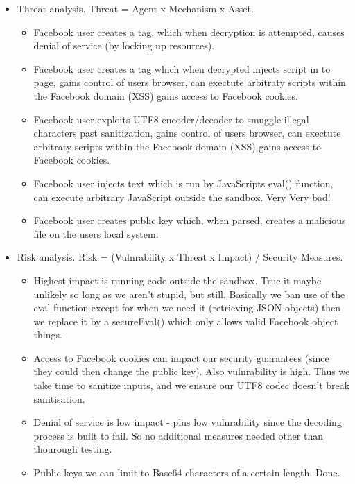         \begin{itemize}
            \item Threat analysis. Threat = Agent x Mechanism x Asset.
            \begin{itemize}
                \item Facebook user creates a tag, which when decryption is attempted, causes denial of service (by locking up resources).
                \item Facebook user creates a tag which when decrypted injects script in to page, gains control of users browser, can exectute arbitraty scripts within the Facebook domain (XSS) gains access to Facebook cookies.
                \item Facebook user exploits UTF8 encoder/decoder to smuggle illegal characters past sanitization, gains control of users browser, can exectute arbitraty scripts within the Facebook domain (XSS) gains access to Facebook cookies.
                \item Facebook user injects text which is run by JavaScripts eval() function, can execute arbitrary JavaScript outside the sandbox. Very Very bad!
                \item Facebook user creates public key which, when parsed, creates a malicious file on the users local system.
            \end{itemize}
            \item Risk analysis. Risk = (Vulnrability x Threat x Impact) / Security Measures.
            \begin{itemize}
                \item Highest impact is running code outside the sandbox. True it maybe unlikely so long as we aren't stupid, but still. Basically we ban use of the eval function except for when we need it (retrieving JSON objects) then we replace it by a secureEval() which only allows valid Facebook object things.
                \item Access to Facebook cookies can impact our security guarantees (since they could then change the public key). Also vulnrability is high. Thus we take time to sanitize inputs, and we ensure our UTF8 codec doesn't break sanitisation.
                \item Denial of service is low impact - plus low vulnrability since the decoding process is built to fail. So no additional measures needed other than thourough testing.
                \item Public keys we can limit to Base64 characters of a certain length. Done.

\end{itemize}
\end{itemize}
